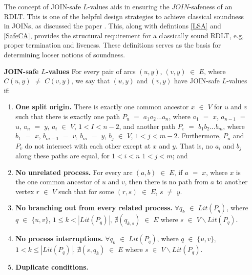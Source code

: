The concept of JOIN-safe $L$-values aids in ensuring the $JOIN$-safeness of an RDLT. This is one of the helpful design strategies to achieve classical soundness in JOINs, as discussed the paper \cite{MalinaoPJS2023}. This, along with defintions \ref{LSA} and \ref{SafeCA}, provides the structural requirement for a classically sound RDLT, e.g, proper termination and liveness. These definitions serves as the basis for determining looser notions of soundness.

\begin{defn}\textbf{JOIN-safe $L$-values} \cite{MalinaoPJS2023}
    \label{JSL}
    For every pair of arcs $(u, y)$, $(v, y)$ $ \in $ $ E $, where $C(u, y)$ $ \neq $ $C(v, y)$, we say that $(u, y)$ and $(v, y)$ have JOIN-safe $L$-values if:

    \begin{enumerate}
        \item \textbf{One split origin.} There is exactly one common ancestor $ x $ $ \in $ $ V $ for $ u $ and $ v $ such that there is exactly one path $ P_u $ $ = $ $ a_1 a_2 \ldots a_n $, where $ a_1 $ $ = $ $ x $, $ a_{n-1} $ $ = $ $ u $, $ a_n $ $ = $ $ y $, $ a_i $ $ \in $ $ V $, $ 1 < I < n - 2 $, and another path $ P_v $ $ = $ $ b_1 b_2 \ldots b_m $, where $ b_1 $ $ = $ $ x $, $ b_{m-1} $ $ = $ $ v $, $ b_m $ $ = $ $ y $, $ b_j $ $ \in $ $ V $, $ 1 < j < m - 2 $. Furthermore, $ P_u $ and $ P_v $ do not intersect with each other except at $ x $ and $ y $. That is, no $ a_i $ and $ b_j $ along these paths are equal, for $ 1 < i < n $ $ 1 < j < m $; and
        \item \textbf{No unrelated process.} For every arc $ (a,b) $ $ \in $ $ E $, if $ a $ $ = $ $ x $, where $x$ is the one common ancestor of $u$ and $v$, then there is no path from $a$ to another vertex $r$ $\in$ $V$ such that for some $(r,s)$ $\in$ $ E $, $s$ $\neq$ $y$.
        \item \textbf{No branching out from every related process.} $\forall q_k $ $ \in $ $ Lit(P_q) $, where $ q $ $ \in $ $ \{u,v\} $, $ 1 \leq k < |Lit(P_q)| $, $ \nexists (q_{k,s}) $ $ \in $ $ E $ where $ s $ $ \in $ $ V \backslash Lit(P_q) $.
        \item \textbf{No process interruptions.} $ \forall q_k $ $ \in $ $ Lit(P_q) $, where $ q $ $ \in $ $ \{u,v\} $, $ 1 < k \leq |Lit(P_q)| $, $ \nexists (s,q_{k}) $ $ \in $ $ E $ where $ s $ $ \in $ $ V \backslash Lit(P_q) $.
        \item \textbf{Duplicate conditions.}
        \begin{itemize}

\end{itemize}
\end{enumerate}
\end{defn}
